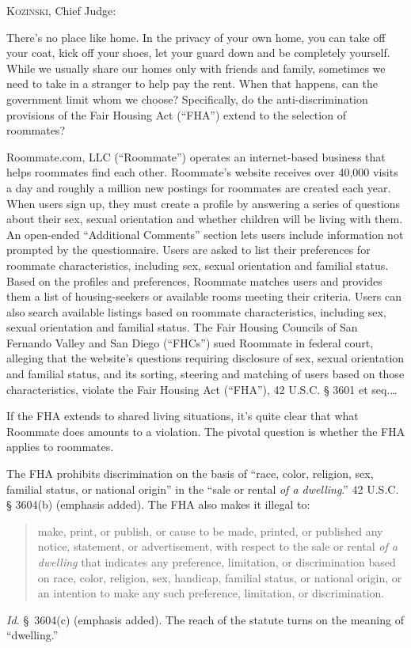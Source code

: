 

\opinion \textsc{Kozinski}, Chief Judge:

There's no place like home. In the privacy of your own home, you can take off
your coat, kick off your shoes, let your guard down and be completely yourself.
While we usually share our homes only with friends and family, sometimes we
need to take in a stranger to help pay the rent. When that happens, can the
government limit whom we choose? Specifically, do the anti-discrimination
provisions of the Fair Housing Act (``FHA'') extend to the selection of
roommates?

Roommate.com, LLC (``Roommate'') operates an internet-based business that helps
roommates find each other. Roommate's website receives over 40,000 visits a day
and roughly a million new postings for roommates are created each year. When
users sign up, they must create a profile by answering a series of questions
about their sex, sexual orientation and whether children will be living with
them. An open-ended ``Additional Comments'' section lets users include
information not prompted by the questionnaire. Users are asked to list their
preferences for roommate characteristics, including sex, sexual orientation and
familial status. Based on the profiles and preferences, Roommate matches users
and provides them a list of housing-seekers or available rooms meeting their
criteria. Users can also search available listings based on roommate
characteristics, including sex, sexual orientation and familial status.  The
Fair Housing Councils of San Fernando Valley and San Diego (``FHCs'') sued
Roommate in federal court, alleging that the website's questions requiring
disclosure of sex, sexual orientation and familial status, and its sorting,
steering and matching of users based on those characteristics, violate the Fair
Housing Act (``FHA''), 42 U.S.C. {\S} 3601 et seq.\ldots


If the FHA extends to shared living situations, it's quite clear that what
Roommate does amounts to a violation. The pivotal question is whether the FHA
applies to roommates. 


The FHA prohibits discrimination on the basis of ``race, color, religion, sex,
familial status, or national origin'' in the ``sale or rental \textit{of a
dwelling}.'' 42 U.S.C. {\S} 3604(b) (emphasis added). The FHA also makes it
illegal to: 
\begin{quote}
make, print, or publish, or cause to be made, printed, or published any notice,
statement, or advertisement, with respect to the sale or rental \textit{of a
dwelling} that indicates any preference, limitation, or discrimination based on
race, color, religion, sex, handicap, familial status, or national origin, or
an intention to make any such preference, limitation, or discrimination.  
\end{quote}
\emph{Id.} \S~3604(c) (emphasis added). The reach of the statute turns on the
meaning of ``dwelling.''

